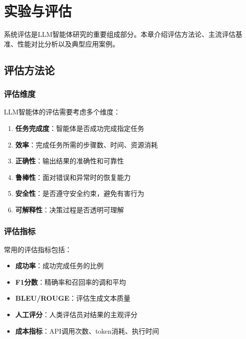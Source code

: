 \section{实验与评估}\label{sec:evaluation}

系统评估是LLM智能体研究的重要组成部分。本章介绍评估方法论、主流评估基准、性能对比分析以及典型应用案例。

\subsection{评估方法论}

\subsubsection{评估维度}

LLM智能体的评估需要考虑多个维度：

\begin{enumerate}[leftmargin=2em]
    \item \textbf{任务完成度}：智能体是否成功完成指定任务
    \item \textbf{效率}：完成任务所需的步骤数、时间、资源消耗
    \item \textbf{正确性}：输出结果的准确性和可靠性
    \item \textbf{鲁棒性}：面对错误和异常时的恢复能力
    \item \textbf{安全性}：是否遵守安全约束，避免有害行为
    \item \textbf{可解释性}：决策过程是否透明可理解
\end{enumerate}

\subsubsection{评估指标}

常用的评估指标包括：

\begin{itemize}[leftmargin=2em]
    \item \textbf{成功率}：成功完成任务的比例
    \item \textbf{F1分数}：精确率和召回率的调和平均
    \item \textbf{BLEU/ROUGE}：评估生成文本质量
    \item \textbf{人工评分}：人类评估员对结果的主观评分
    \item \textbf{成本指标}：API调用次数、token消耗、执行时间
\end{itemize}

